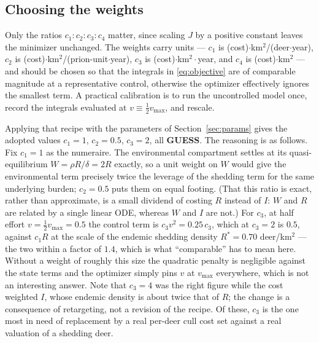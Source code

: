 \documentclass[11pt]{article}
\newcommand{\tagGUESS}{{\footnotesize\textsf{\textbf{\textcolor{red!70!black}{GUESS}}}}}
\begin{document}
\subsection{Choosing the weights}

Only the ratios $c_1:c_2:c_3:c_4$ matter, since scaling $J$ by a positive constant leaves the minimizer unchanged. The weights carry units --- $c_1$ is (cost)$\cdot$km$^2$/(deer$\cdot$year), $c_2$ is (cost)$\cdot$km$^2$/(prion-unit$\cdot$year), $c_3$ is (cost)$\cdot$km$^2\cdot$year, and $c_4$ is (cost)$\cdot$km$^2$ --- and should be chosen so that the integrals in \eqref{eq:objective} are of comparable magnitude at a representative control, otherwise the optimizer effectively ignores the smallest term. A practical calibration is to run the uncontrolled model once, record the integrals evaluated at $v\equiv \tfrac12 v_{\max}$, and rescale.

Applying that recipe with the parameters of Section~\ref{sec:params} gives the adopted values $c_1 = 1$, $c_2 = 0.5$, $c_3 = 2$, all \tagGUESS{}. The reasoning is as follows. Fix $c_1 = 1$ as the numeraire. The environmental compartment settles at its quasi-equilibrium $W = \rho R/\delta = 2R$ exactly, so a unit weight on $W$ would give the environmental term precisely twice the leverage of the shedding term for the same underlying burden; $c_2 = 0.5$ puts them on equal footing. (That this ratio is exact, rather than approximate, is a small dividend of costing $R$ instead of $I$: $W$ and $R$ are related by a single linear ODE, whereas $W$ and $I$ are not.) For $c_3$, at half effort $v = \tfrac12 v_{\max} = 0.5$ the control term is $c_3 v^2 = 0.25\,c_3$, which at $c_3 = 2$ is $0.5$, against $c_1 R$ at the scale of the endemic shedding density $R^* = 0.70$ deer/km$^2$ --- the two within a factor of $1.4$, which is what ``comparable'' has to mean here. Without a weight of roughly this size the quadratic penalty is negligible against the state terms and the optimizer simply pins $v$ at $v_{\max}$ everywhere, which is not an interesting answer. Note that $c_3 = 4$ was the right figure while the cost weighted $I$, whose endemic density is about twice that of $R$; the change is a consequence of retargeting, not a revision of the recipe. Of these, $c_3$ is the one most in need of replacement by a real per-deer cull cost set against a real valuation of a shedding deer.
\end{document}
